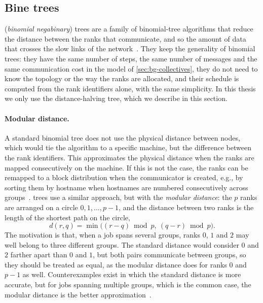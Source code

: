 \subsection{Bine trees}\label{sec:bg-bine}

\bine{} (\emph{binomial negabinary}) trees are a family of binomial-tree algorithms that reduce the distance between the ranks that communicate, and so the amount of data that crosses the slow links of the network~\cite{desensi2025bine}.
They keep the generality of binomial trees: they have the same number of steps, the same number of messages and the same communication cost in the model of \cref{sec:bg-collectives}, they do not need to know the topology or the way the ranks are allocated, and their schedule is computed from the rank identifiers alone, with the same simplicity.
In this thesis we only use the distance-halving \bine{} tree, which we describe in this section.

\paragraph{Modular distance.}
A standard binomial tree does not use the physical distance between nodes, which would tie the algorithm to a specific machine, but the difference between the rank identifiers.
This approximates the physical distance when the ranks are mapped consecutively on the machine.
If this is not the case, the ranks can be remapped to a block distribution when the communicator is created, e.g., by sorting them by hostname when hostnames are numbered consecutively across groups~\cite{desensi2025bine}.
\bine{} trees use a similar approach, but with the \emph{modular distance}: the $p$ ranks are arranged on a circle $0,1,\dots,p-1$, and the distance between two ranks is the length of the shortest path on the circle,
\begin{equation}
  d(r,q)=\min\bigl((r-q)\bmod p,\ (q-r)\bmod p\bigr).
\end{equation}
The motivation is that, when a job spans several groups, ranks $0$, $1$ and $2$ may well belong to three different groups.
The standard distance would consider $0$ and $2$ farther apart than $0$ and $1$, but both pairs communicate between groups, so they should be treated as equal, as the modular distance does for ranks $0$ and $p-1$ as well.
Counterexamples exist in which the standard distance is more accurate, but for jobs spanning multiple groups, which is the common case, the modular distance is the better approximation~\cite{desensi2025bine}.

